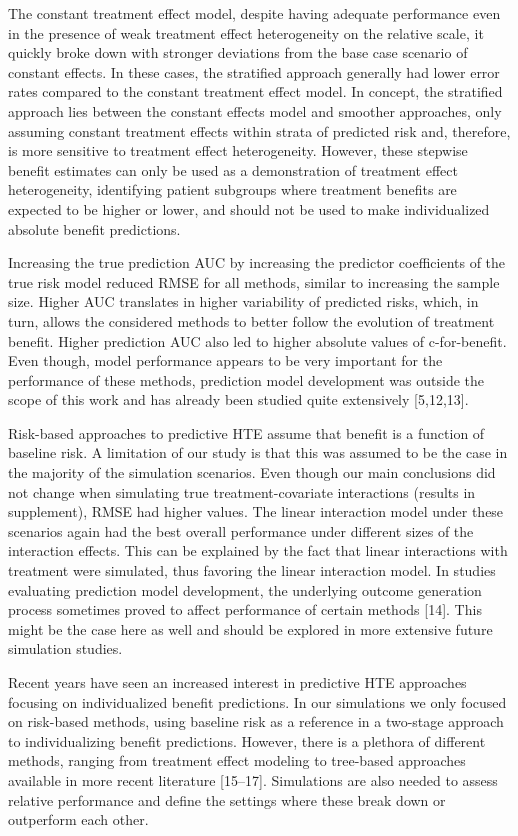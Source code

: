 \documentclass{article}
\begin{document}
The constant treatment effect model, despite having adequate performance
even in the presence of weak treatment effect heterogeneity on the
relative scale, it quickly broke down with stronger deviations from the
base case scenario of constant effects. In these cases, the stratified
approach generally had lower error rates compared to the constant
treatment effect model. In concept, the stratified approach lies between
the constant effects model and smoother approaches, only assuming
constant treatment effects within strata of predicted risk and,
therefore, is more sensitive to treatment effect heterogeneity. However,
these stepwise benefit estimates can only be used as a demonstration of
treatment effect heterogeneity, identifying patient subgroups where
treatment benefits are expected to be higher or lower, and should not be
used to make individualized absolute benefit predictions.

Increasing the true prediction AUC by increasing the predictor
coefficients of the true risk model reduced RMSE for all methods,
similar to increasing the sample size. Higher AUC translates in higher
variability of predicted risks, which, in turn, allows the considered
methods to better follow the evolution of treatment benefit. Higher
prediction AUC also led to higher absolute values of c-for-benefit. Even
though, model performance appears to be very important for the
performance of these methods, prediction model development was outside
the scope of this work and has already been studied quite extensively
{[}5,12,13{]}.

Risk-based approaches to predictive HTE assume that benefit is a
function of baseline risk. A limitation of our study is that this was
assumed to be the case in the majority of the simulation scenarios. Even
though our main conclusions did not change when simulating true
treatment-covariate interactions (results in supplement), RMSE had
higher values. The linear interaction model under these scenarios again
had the best overall performance under different sizes of the
interaction effects. This can be explained by the fact that linear
interactions with treatment were simulated, thus favoring the linear
interaction model. In studies evaluating prediction model development,
the underlying outcome generation process sometimes proved to affect
performance of certain methods {[}14{]}. This might be the case here as
well and should be explored in more extensive future simulation studies.

Recent years have seen an increased interest in predictive HTE
approaches focusing on individualized benefit predictions. In our
simulations we only focused on risk-based methods, using baseline risk
as a reference in a two-stage approach to individualizing benefit
predictions. However, there is a plethora of different methods, ranging
from treatment effect modeling to tree-based approaches available in
more recent literature {[}15--17{]}. Simulations are also needed to
assess relative performance and define the settings where these break
down or outperform each other.
\end{document}
